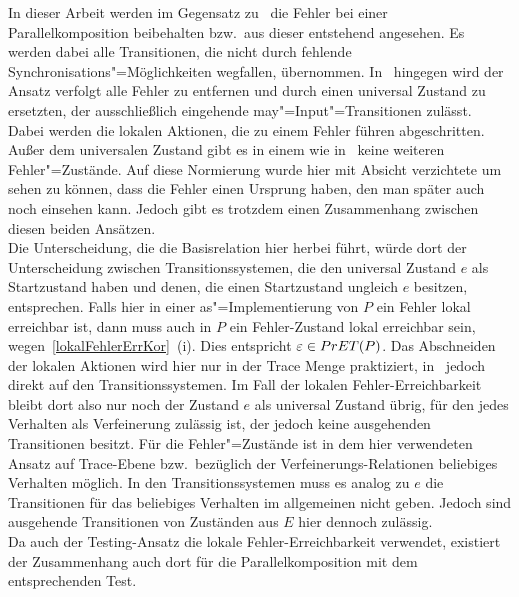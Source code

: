 In dieser Arbeit werden im Gegensatz zu~\cite{Vogler2016MIA3} die Fehler bei
einer Parallelkomposition beibehalten bzw.\ aus dieser entstehend angesehen. Es
werden dabei alle Transitionen, die nicht durch fehlende
Synchronisations"=Möglichkeiten wegfallen, übernommen. In~\cite{Vogler2016MIA3}
hingegen wird der Ansatz verfolgt alle Fehler zu entfernen und durch einen
universal Zustand zu ersetzten, der ausschließlich eingehende
may"=Input"=Transitionen zulässt. Dabei werden die lokalen Aktionen, die zu
einem Fehler führen abgeschritten. Außer dem universalen Zustand gibt es in
einem \MIA{} wie in~\cite{Vogler2016MIA3} keine weiteren Fehler"=Zustände. Auf
diese Normierung wurde hier mit Absicht verzichtete um sehen zu können, dass
die Fehler einen Ursprung haben, den man später auch noch einsehen kann. Jedoch
gibt es trotzdem einen Zusammenhang zwischen diesen beiden Ansätzen.\\
Die Unterscheidung, die die Basisrelation \EBRel{} hier herbei führt, würde
dort der Unterscheidung zwischen Transitionssystemen, die den universal
Zustand $e$ als Startzustand haben und denen, die einen Startzustand ungleich
$e$ besitzen, entsprechen. Falls hier in einer as"=Implementierung von $P$ ein
Fehler lokal erreichbar ist, dann muss auch in $P$ ein Fehler-Zustand lokal
erreichbar sein, wegen~\ref{lokalFehlerErrKor}~(i). Dies entspricht
$\varepsilon \in PrET (P)$. Das Abschneiden der lokalen Aktionen wird hier nur
in der Trace Menge praktiziert, in~\cite{Vogler2016MIA3} jedoch direkt auf den
Transitionssystemen. Im Fall der lokalen Fehler-Erreichbarkeit bleibt dort also
nur noch der Zustand $e$ als universal Zustand übrig, für den jedes Verhalten
als Verfeinerung zulässig ist, der jedoch keine ausgehenden Transitionen
besitzt. Für die Fehler"=Zustände ist in dem hier verwendeten Ansatz auf
Trace-Ebene bzw.\ bezüglich der Verfeinerungs-Relationen beliebiges Verhalten
möglich. In den Transitionssystemen muss es analog zu $e$ die Transitionen für
das beliebiges Verhalten im allgemeinen nicht geben. Jedoch sind ausgehende
Transitionen von Zuständen aus $E$ hier dennoch zulässig.\\
Da auch der Testing-Ansatz die lokale Fehler-Erreichbarkeit verwendet,
existiert der Zusammenhang auch dort für die Parallelkomposition mit dem
entsprechenden Test.

